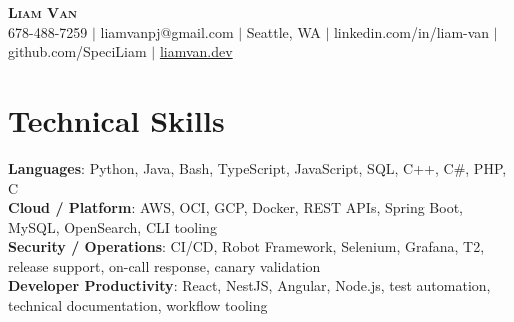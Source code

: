 \documentclass[letterpaper,11pt]{article}
\begin{document}

%
\begin{center}
    \textbf{\Huge \scshape Liam Van} \\ \vspace{1pt}
    \small 678-488-7259 $|$ \small {liamvanpj@gmail.com} $|$ Seattle, WA
 {{$|$ linkedin.com/in/liam-van} {$|$ github.com/SpeciLiam} {$|$ \href{https://liamvan.dev}{liamvan.dev}}}

\end{center}

\section{Technical Skills}
 \begin{itemize}[leftmargin=0.15in, label={}]
    \small{\item{
     \textbf{Languages}{: Python, Java, Bash, TypeScript, JavaScript, SQL, C++, C\#, PHP, C} \\
     \textbf{Cloud / Platform}{: AWS, OCI, GCP, Docker, REST APIs, Spring Boot, MySQL, OpenSearch, CLI tooling} \\
     \textbf{Security / Operations}{: CI/CD, Robot Framework, Selenium, Grafana, T2, release support, on-call response, canary validation} \\
     \textbf{Developer Productivity}{: React, NestJS, Angular, Node.js, test automation, technical documentation, workflow tooling} \\
    }}
 \end{itemize}
%
\end{document}

